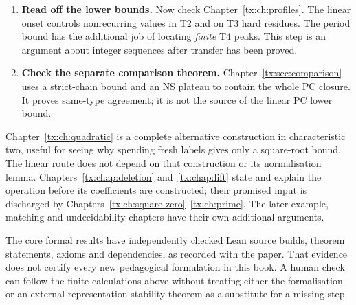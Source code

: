 \documentclass[11pt,a4paper,oneside,openany]{book}
\theoremstyle{definition}\newtheorem{definition}[theorem]{Definition}
\theoremstyle{remark}\newtheorem{remark}[theorem]{Remark}
\numberwithin{equation}{chapter}
\begin{document}
\begin{enumerate}
The pairing doubles the original monomial support $kd$.
\item \textbf{Read off the lower bounds.}
Now check Chapter~\ref{tx:ch:profiles}. The linear onset controls
nonrecurring values in T2 and on T3 hard residues. The period bound
has the additional job of locating \emph{finite} T4 peaks. This step
is an argument about integer sequences after transfer has been proved.
\item \textbf{Check the separate comparison theorem.}
Chapter~\ref{tx:sec:comparison} uses a strict-chain bound and an NS
plateau to contain the whole PC closure. It proves same-type agreement;
it is not the source of the linear PC lower bound.
\end{enumerate}

Chapter~\ref{tx:ch:quadratic} is a complete alternative construction in
characteristic two, useful for seeing why spending fresh labels gives
only a square-root bound. The linear route does not depend on that
construction or its normalisation lemma. Chapters~\ref{tx:chap:deletion}
and~\ref{tx:chap:lift} state and explain the operation before its
coefficients are constructed; their promised input is discharged by
Chapters~\ref{tx:ch:square-zero}--\ref{tx:ch:prime}.
The later example, matching and undecidability chapters have their own
additional arguments.

The core formal results have independently checked Lean source builds,
theorem statements, axioms and dependencies, as recorded with the paper.
That evidence does not certify every new pedagogical formulation in this
book. A human check can follow the finite calculations above without
treating either the formalisation or an external representation-stability
theorem as a substitute for a missing step.
\end{document}
